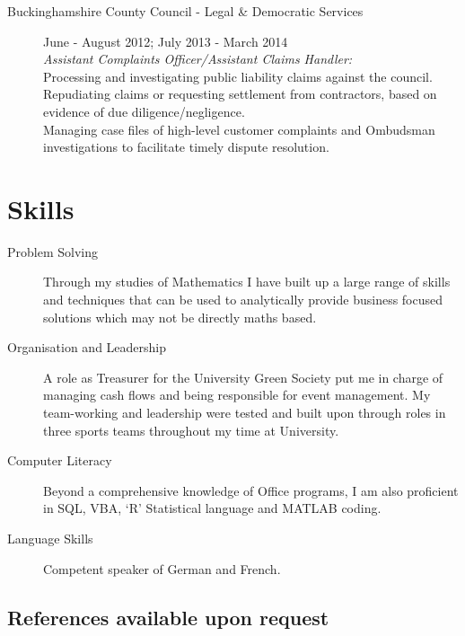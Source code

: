 \documentclass[10pt]{article}
\begin{document}
\begin{description}
\item[Buckinghamshire County Council - Legal \& Democratic Services]June - August 2012; July 2013 - March 2014\\
\emph{Assistant Complaints Officer/Assistant Claims Handler:}
\\Processing and investigating public liability claims against the council. Repudiating claims or requesting settlement from contractors, based on evidence of due diligence/negligence.
\\ Managing case files of high-level customer complaints and Ombudsman investigations to facilitate timely dispute resolution.
\end{description}

\section*{Skills}
\begin{description}
\item[Problem Solving] Through my studies of Mathematics I have built up a large range of skills and techniques that can be used to analytically provide business focused solutions which may not be directly maths based.
\item[Organisation and Leadership]A role as Treasurer for the University Green Society put me in charge of managing cash flows and being responsible for event management. My team-working and leadership were tested and built upon through roles in three sports teams throughout my time at University.
\item[Computer Literacy] Beyond a comprehensive knowledge of Office programs, I am also proficient in SQL, VBA, `R' Statistical language and MATLAB coding.
\item[Language Skills] Competent speaker of German and French.
\end{description}

\subsection*{References available upon request}
\end{document}
